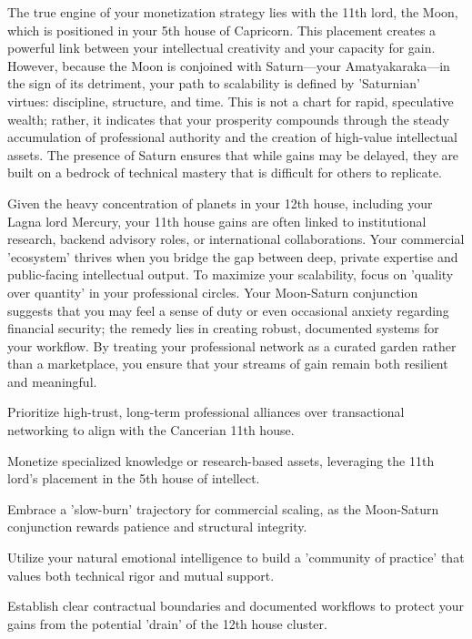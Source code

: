 {\fontsize{9}{13}\selectfont The true engine of your monetization strategy lies with the 11th lord, the Moon, which is positioned in your 5th house of Capricorn. This placement creates a powerful link between your intellectual creativity and your capacity for gain. However, because the Moon is conjoined with Saturn---your Amatyakaraka---in the sign of its detriment, your path to scalability is defined by 'Saturnian' virtues: discipline, structure, and time. This is not a chart for rapid, speculative wealth; rather, it indicates that your prosperity compounds through the steady accumulation of professional authority and the creation of high-value intellectual assets. The presence of Saturn ensures that while gains may be delayed, they are built on a bedrock of technical mastery that is difficult for others to replicate.}\par\vspace{1.8mm}

{\fontsize{9}{13}\selectfont Given the heavy concentration of planets in your 12th house, including your Lagna lord Mercury, your 11th house gains are often linked to institutional research, backend advisory roles, or international collaborations. Your commercial 'ecosystem' thrives when you bridge the gap between deep, private expertise and public-facing intellectual output. To maximize your scalability, focus on 'quality over quantity' in your professional circles. Your Moon-Saturn conjunction suggests that you may feel a sense of duty or even occasional anxiety regarding financial security; the remedy lies in creating robust, documented systems for your workflow. By treating your professional network as a curated garden rather than a marketplace, you ensure that your streams of gain remain both resilient and meaningful.}\par\vspace{1.8mm}

\begin{diamondlist}
  \item {\fontsize{8.5}{12}\selectfont Prioritize high-trust, long-term professional alliances over transactional networking to align with the Cancerian 11th house.}
  \item {\fontsize{8.5}{12}\selectfont Monetize specialized knowledge or research-based assets, leveraging the 11th lord's placement in the 5th house of intellect.}
  \item {\fontsize{8.5}{12}\selectfont Embrace a 'slow-burn' trajectory for commercial scaling, as the Moon-Saturn conjunction rewards patience and structural integrity.}
  \item {\fontsize{8.5}{12}\selectfont Utilize your natural emotional intelligence to build a 'community of practice' that values both technical rigor and mutual support.}
  \item {\fontsize{8.5}{12}\selectfont Establish clear contractual boundaries and documented workflows to protect your gains from the potential 'drain' of the 12th house cluster.}
\end{diamondlist}

